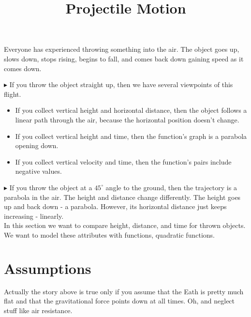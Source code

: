 \documentclass{ximera}
\title{Projectile Motion}
\begin{document}
\begin{abstract}
\end{abstract}
\maketitle



Everyone has experienced throwing something into the air. The object goes up, slows down, stops rising, begins to fall, and comes back down gaining speed as it comes down.  





$\blacktriangleright$ If you throw the object straight up, then we have several viewpoints of this flight. 

\begin{itemize}
\item If you collect vertical height and horizontal distance, then the object follows a linear path through the air, because the horizontal position doesn't change.  
\item If you collect vertical height and time, then the function's graph is a parabola opening down.
\item If you collect vertical velocity and time, then the function's pairs include negative values.
\end{itemize}




$\blacktriangleright$  If you throw the object at a $45^{\circ}$ angle to the ground, then the trajectory is a parabola in the air.  The height and distance change differently.  The height goes up and back down - a parabola.  However, its horizontal distance just keeps increasing - linearly. \\


In this section we want to compare height, distance, and time for thrown objects. \\

We want to model these attributes with functions, quadratic functions.



\section{Assumptions}

Actually the story above is true only if you assume that the Eath is pretty much flat and that the gravitational force points down at all times. Oh, and neglect stuff like air resistance.
\end{document}
